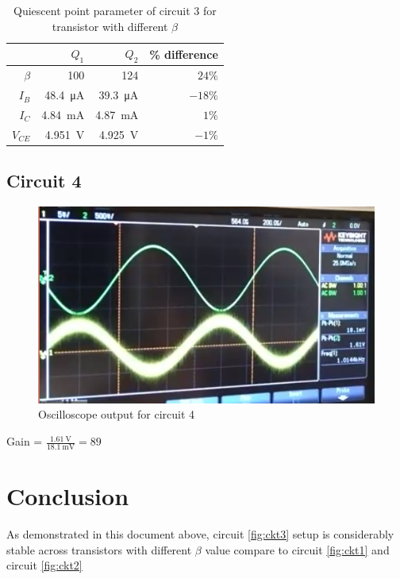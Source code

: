 \documentclass{article}
\begin{document}
\begin{table}[H]
  \caption{Quiescent point parameter of circuit 3 for transistor with different $\beta$}
  \centering
    \begin{tabular}{rrrr}
      \toprule
       &$Q_1$&$Q_2$&\% difference\\
      \midrule
      $\beta$&100&124&$24\%$\\
      $I_B$&\SI{48.4}{\micro\ampere}&\SI{39.3}{\micro\ampere}&$-18\%$\\
      $I_C$&\SI{4.84}{\milli\ampere}&\SI{4.87}{\milli\ampere}&$1\%$\\
      $V_{CE}$&\SI{4.951}{\volt}&\SI{4.925}{\volt}&$-1\%$\\
    \bottomrule
  \end{tabular}
  \label{tab:ckt3_calc}%
\end{table}

\newpage

\subsection*{Circuit 4}

\begin{figure}[H]
  \centering
  \includegraphics[width=\textwidth]{ECE2200L_Lab6.png}
  \caption{Oscilloscope output for circuit 4}
  \label{fig:scope}
\end{figure}

Gain = $\frac{\SI{1.61}{\volt}}{\SI{18.1}{\milli\volt}}=89$

\section*{Conclusion}
As demonstrated in this document above, circuit \ref{fig:ckt3} setup is considerably stable across transistors with different $\beta$ value compare to circuit \ref{fig:ckt1} and circuit \ref{fig:ckt2}
\end{document}
